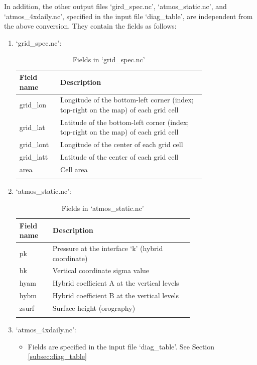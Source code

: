 \documentclass[11pt,fleqn]{report}              %
\begin{document}
In addition, the other output files `gird\_spec.nc', `atmos\_static.nc', and `atmos\_4xdaily.nc', specified in the input file `diag\_table', are independent from the above conversion. They contain the fields as follows:
\begin{enumerate}
\item `grid\_spec.nc':
{
\fontsize{10}{12}\selectfont
\begin{longtable}{p{0.12\linewidth} | p{0.65\linewidth} }
\hline
\hline
Field name & Description \\
\hline
 grid\_lon & Longitude of the bottom-left corner (index; top-right on the map) of each grid cell \\
 grid\_lat & Latitude of the bottom-left corner (index; top-right on the map) of each grid cell \\
 grid\_lont & Longitude of the center of each grid cell \\
 grid\_latt & Latitude of the center of each grid cell  \\
 area & Cell area  \\
\hline
\caption{Fields in `grid\_spec.nc'}
\label{table:fv3_out_grid_spec}
\end{longtable}
}

\item `atmos\_static.nc':
{
\fontsize{10}{12}\selectfont
\begin{longtable}{ p{0.12\linewidth} | p{0.6\linewidth} }
\hline
\hline
 Field name & Description \\
\hline
 pk & Pressure at the interface `k' (hybrid coordinate)  \\
 bk & Vertical coordinate sigma value \\
 hyam & Hybrid coefficient A at the vertical levels \\
 hybm & Hybrid coefficient B at the vertical levels  \\
 zsurf & Surface height (orography)  \\
\hline
\caption{Fields in `atmos\_static.nc'}
\label{table:fv3_out_atmos_static}
\end{longtable}
}

\item `atmos\_4xdaily.nc':
\begin{itemize}
\item Fields are specified in the input file `diag\_table'. See Section \ref{subsec:diag_table}
\end{itemize}



\end{enumerate}
\end{document}

